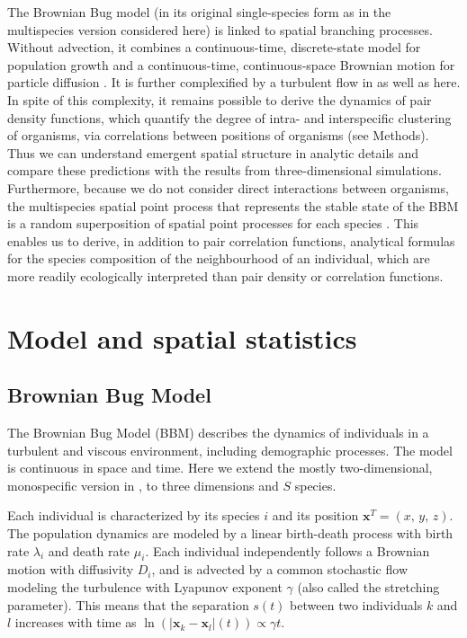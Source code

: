 \documentclass[english]{article}
\newcommand{\bx}{\boldsymbol{x}}
\begin{document}
The Brownian Bug model (in its original single-species form as in
the multispecies version considered here) is linked to spatial branching
processes. Without advection, it combines a continuous-time, discrete-state
model for population growth and a continuous-time, continuous-space
Brownian motion for particle diffusion \citep{birch_master_2006}.
It is further complexified by a turbulent flow in \citet{young_reproductive_2001,picoche_rescience_2022}
as well as here. In spite of this complexity, it remains possible
to derive the dynamics of pair density functions, which quantify the
degree of intra- and interspecific clustering of organisms, via correlations
between positions of organisms (see Methods). Thus we can understand
emergent spatial structure in analytic details and compare these predictions
with the results from three-dimensional simulations. Furthermore,
because we do not consider direct interactions between organisms,
the multispecies spatial point process that represents the stable
state of the BBM is a random superposition of spatial point processes
for each species \citep{illian2008statistical}. This enables us to
derive, in addition to pair correlation functions, analytical formulas
for the species composition of the neighbourhood of an individual,
which are more readily ecologically interpreted than pair density
or correlation functions. 


\section*{Model and spatial statistics}

\subsection*{Brownian Bug Model}

The Brownian Bug Model (BBM) describes the dynamics of individuals
in a turbulent and viscous environment, including demographic processes.
The model is continuous in space and time. Here we extend the mostly
two-dimensional, monospecific version in \citet{young_reproductive_2001},
to three dimensions and $S$ species.

Each individual is characterized by its species $i$ and its position
$\mathbf{x}^{T}=(x,\,y,\,z)$. The population dynamics are modeled
by a linear birth-death process with birth rate $\lambda_{i}$ and
death rate $\mu_{i}$. Each individual independently follows a Brownian
motion with diffusivity $D_{i}$, and is advected by a common stochastic
flow modeling the turbulence with Lyapunov exponent $\gamma$ (also
called the stretching parameter). This means that the separation $s(t)$ between
two individuals $k$ and $l$ increases with time as $\ln\left(|\bx_{k}-\bx_{l}|(t)\right)\propto \gamma t$.
\end{document}
